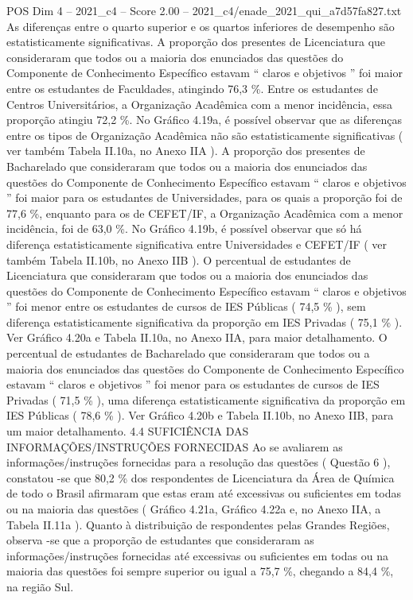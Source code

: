 \begin{textsample}{POS Dim 4 – 2021\_c4 – Score 2.00 – 2021\_c4/enade\_2021\_qui\_a7d57fa827.txt}
As diferenças entre o quarto superior e os quartos inferiores de desempenho são estatisticamente significativas.
A proporção dos presentes de Licenciatura que consideraram que todos ou a maioria dos enunciados das questões do Componente de Conhecimento Específico estavam “ claros e objetivos ” foi maior entre os estudantes de Faculdades, atingindo 76,3 \%.
Entre os estudantes de Centros Universitários, a Organização Acadêmica com a menor incidência, essa proporção atingiu 72,2 \%.
No Gráfico 4.19a, é possível observar que as diferenças entre os tipos de Organização Acadêmica não são estatisticamente significativas ( ver também Tabela II.10a, no Anexo IIA ).
A proporção dos presentes de Bacharelado que consideraram que todos ou a maioria dos enunciados das questões do Componente de Conhecimento Específico estavam “ claros e objetivos ” foi maior para os estudantes de Universidades, para os quais a proporção foi de 77,6 \%, enquanto para os de CEFET/IF, a Organização Acadêmica com a menor incidência, foi de 63,0 \%.
No Gráfico 4.19b, é possível observar que só há diferença estatisticamente significativa entre Universidades e CEFET/IF ( ver também Tabela II.10b, no Anexo IIB ).
O percentual de estudantes de Licenciatura que consideraram que todos ou a maioria dos enunciados das questões do Componente de Conhecimento Específico estavam “ claros e objetivos ” foi menor entre os estudantes de cursos de IES Públicas ( 74,5 \% ), sem diferença estatisticamente significativa da proporção em IES Privadas ( 75,1 \% ).
Ver Gráfico 4.20a e Tabela II.10a, no Anexo IIA, para maior detalhamento.
O percentual de estudantes de Bacharelado que consideraram que todos ou a maioria dos enunciados das questões do Componente de Conhecimento Específico estavam “ claros e objetivos ” foi menor para os estudantes de cursos de IES Privadas ( 71,5 \% ), uma diferença estatisticamente significativa da proporção em IES Públicas ( 78,6 \% ).
Ver Gráfico 4.20b e Tabela II.10b, no Anexo IIB, para um maior detalhamento. 4.4 SUFICIÊNCIA DAS INFORMAÇÕES/INSTRUÇÕES FORNECIDAS Ao se avaliarem as informações/instruções fornecidas para a resolução das questões ( Questão 6 ), constatou -se que 80,2 \% dos respondentes de Licenciatura da Área de Química de todo o Brasil afirmaram que estas eram até excessivas ou suficientes em todas ou na maioria das questões ( Gráfico 4.21a, Gráfico 4.22a e, no Anexo IIA, a Tabela II.11a ).
Quanto à distribuição de respondentes pelas Grandes Regiões, observa -se que a proporção de estudantes que consideraram as informações/instruções fornecidas até excessivas ou suficientes em todas ou na maioria das questões foi sempre superior ou igual a 75,7 \%, chegando a 84,4 \%, na região Sul.

\end{textsample}

